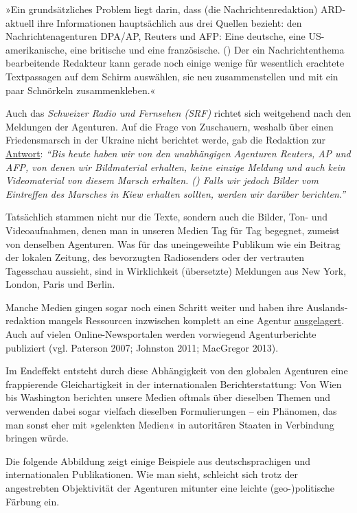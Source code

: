 »Ein grundsätzliches Problem liegt darin, dass (die
Nach­rich­ten­redaktion) ARD-aktuell ihre Informationen hauptsächlich
aus drei Quellen bezieht: den Nachrichtenagenturen DPA/AP, Reuters und
AFP: Eine deutsche, eine US-amerikanische, eine britische und eine
französische. () Der ein Nachrichten­thema bearbeitende Redakteur kann
gerade noch einige wenige für wesentlich erachtete Text­passagen auf dem
Schirm auswählen, sie neu zusammen­­stellen und mit ein paar Schnörkeln
zusammen­kleben.«

Auch das \emph{Schweizer Radio und Fernsehen (SRF)} richtet sich
weitgehend nach den Meldungen der Agenturen. Auf die Frage von
Zuschauern, weshalb über einen Friedens­marsch in der Ukraine nicht
berichtet werde, gab die Redaktion zur
\href{http://www.srf.ch/sendungen/hallosrf/warum-berichtet-srf-nicht-ueber-den-friedensmarsch-in-der-ukraine}{Antwort}:
\emph{``Bis heute haben wir von den unabhängigen Agenturen Reuters, AP
und AFP, von denen wir Bildmaterial erhalten, keine einzige Meldung und
auch kein Videomaterial von diesem Marsch erhalten. () Falls wir jedoch
Bilder vom Eintreffen des Marsches in Kiew erhalten sollten, werden wir
darüber berichten.''}

Tatsächlich stammen nicht nur die Texte, sondern auch die Bilder, Ton-
und Videoaufnahmen, denen man in unseren Medien Tag für Tag begegnet,
zumeist von denselben Agenturen. Was für das uneingeweihte Publikum wie
ein Beitrag der lokalen Zeitung, des bevorzugten Radiosenders oder der
vertrauten Tagesschau aussieht, sind in Wirklichkeit (übersetzte)
Meldungen aus New York, London, Paris und Berlin.

Manche Medien gingen sogar noch einen Schritt weiter und haben ihre
Auslands­redaktion mangels Ressourcen inzwischen komplett an eine
Agentur
\href{https://web.archive.org/web/20130402032805/http://www.sda.ch/fileadmin/user_upload/domain1/pdf_s/medienmitteilung.pdf}{ausgelagert}.
Auch auf vielen Online-News­portalen werden vorwiegend Agenturberichte
publiziert (vgl. Paterson 2007; Johnston 2011; MacGregor 2013).

Im Endeffekt entsteht durch diese Abhängigkeit von den globalen
Agenturen eine frappierende Gleichartigkeit in der internationalen
Berichterstattung: Von Wien bis Washington berichten unsere Medien
oftmals über dieselben Themen und verwenden dabei sogar vielfach
dieselben Formulierungen -- ein Phänomen, das man sonst eher mit
»gelenkten Medien« in autoritären Staaten in Verbindung bringen würde.

Die folgende Abbildung zeigt einige Beispiele aus deutsch­sprachigen und
internationalen Publikationen. Wie man sieht, schleicht sich trotz der
angestrebten Objektivität der Agenturen mitunter eine leichte
(geo-)politische Färbung ein.

